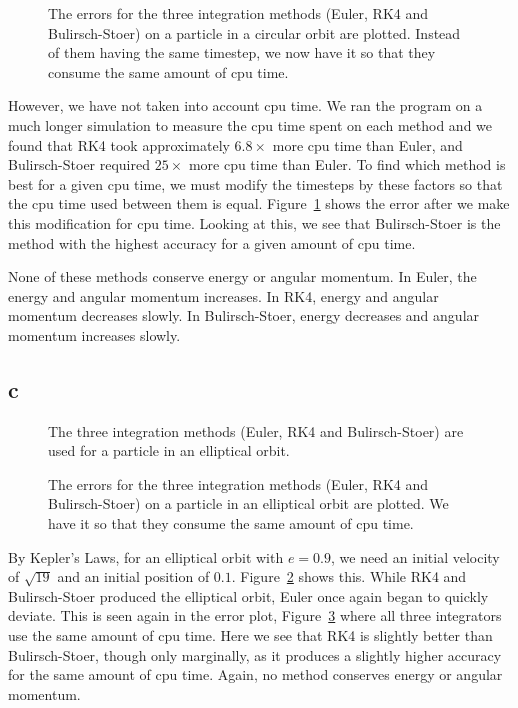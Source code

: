 \documentclass[11pt]{article}
\begin{document}
\begin{figure}
  \centering
\resizebox{0.6\textwidth}{!}{}
  \caption{The errors for the three integration methods (Euler, RK4 and Bulirsch-Stoer) on a particle in a circular orbit are plotted. Instead of them having the same timestep, we now have it so that they consume the same amount of cpu time.}
  \label{q1b-error-cpu}
\end{figure}
However, we have not taken into account cpu time. We ran the program on a much longer simulation to measure the cpu time spent on each method and we found that RK4 took approximately $6.8\times$ more cpu time than Euler, and Bulirsch-Stoer required $25\times$ more cpu time than Euler. To find which method is best for a given cpu time, we must modify the timesteps by these factors so that the cpu time used between them is equal. Figure~\ref{q1b-error-cpu} shows the error after we make this modification for cpu time. Looking at this, we see that Bulirsch-Stoer is the method with the highest accuracy for a given amount of cpu time.

None of these methods conserve energy or angular momentum. In Euler, the energy and angular momentum increases. In RK4, energy and angular momentum decreases slowly. In Bulirsch-Stoer, energy decreases and angular momentum increases slowly.

\subsection{c}
\begin{figure}
  \centering
\resizebox{0.6\textwidth}{!}{}
  \caption{The three integration methods (Euler, RK4 and Bulirsch-Stoer) are used for a particle in an elliptical orbit.}
  \label{q1c-plot}
\end{figure}
\begin{figure}
  \centering
\resizebox{0.6\textwidth}{!}{}
  \caption{The errors for the three integration methods (Euler, RK4 and Bulirsch-Stoer) on a particle in an elliptical orbit are plotted. We have it so that they consume the same amount of cpu time.}
  \label{q1c-error-cpu}
\end{figure}

By Kepler's Laws, for an elliptical orbit with $e=0.9$, we need an initial velocity of $\sqrt{19}$ and an initial position of $0.1$. Figure~\ref{q1c-plot} shows this. While RK4 and Bulirsch-Stoer produced the elliptical orbit, Euler once again began to quickly deviate. This is seen again in the error plot, Figure~\ref{q1c-error-cpu} where all three integrators use the same amount of cpu time. Here we see that RK4 is slightly better than Bulirsch-Stoer, though only marginally, as it produces a slightly higher accuracy for the same amount of cpu time. Again, no method conserves energy or angular momentum. 
\end{document}

